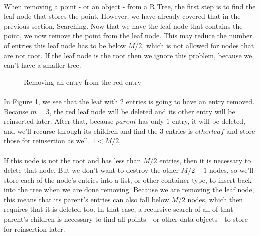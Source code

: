 \documentclass{article}
\begin{document}
\paragraph{}
When removing a point - or an object - from a R Tree, the first step is to find the leaf node that stores the point.
However, we have already covered that in the previous section, Searching. Now that we have the leaf node that contains
the point, we now remove the point from the leaf node. This may reduce the number of entries this leaf node has to be below
$M/2$, which is not allowed for nodes that are not root. If the leaf node is the root then we ignore this problem, because
we can't have a smaller tree.\\
\begin{figure}
\caption{Removing an entry from the red entry}
\centering
{}
\end{figure}
\paragraph{}
In Figure 1, we see that the leaf with $2$ entries is going to have an entry removed. Because $m=3$, the red leaf node will be deleted
and its other entry will be reinserted later.
After that, because $parent$ has only $1$ entry, it will be deleted, and we'll recurse through its children and find the $3$ entries
is $other leaf$ and store those for reinsertion as well.
$1 < M/2$, 
\paragraph{}
If this node is not the root and has less than $M/2$ entries, then it is necessary to delete that node. But we don't want to destroy
the other $M/2 - 1$ nodes, so we'll store each of the node's entries into a list, or other container type, to insert back into
the tree when we are done removing. Because we are removing the leaf node, this means that its parent's entries can also fall below
$M/2$ nodes, which then requires that it is deleted too. In that case, a recursive search of all of that parent's children is necessary
to find all points - or other data objects - to store for reinsertion later.
\end{document}
